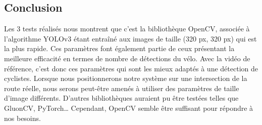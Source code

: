 \subsection{Conclusion}
\label{sec:comparaisonIA:conclusion}

Les 3 tests réalisés nous montrent que c'est la bibliothèque OpenCV,
associée à l'algorithme YOLOv3 étant entraîné aux images de taille (320 px, 320 px) qui est la plus rapide.
Ces paramètres font également partie de ceux présentant la meilleure efficacité en termes de nombre de détections du vélo.
Avec la vidéo de référence, c'est donc ces paramètres qui sont les mieux adaptés à une détection de cyclistes.
Lorsque nous positionnerons notre système sur une intersection de la route réelle, 
nous serons peut-être amenés à utiliser des paramètres de taille d'image différents.
D'autres bibliothèques auraient pu être testées telles que GluonCV, PyTorch\dots
Cependant, OpenCV semble être suffisant pour répondre à nos besoins.
